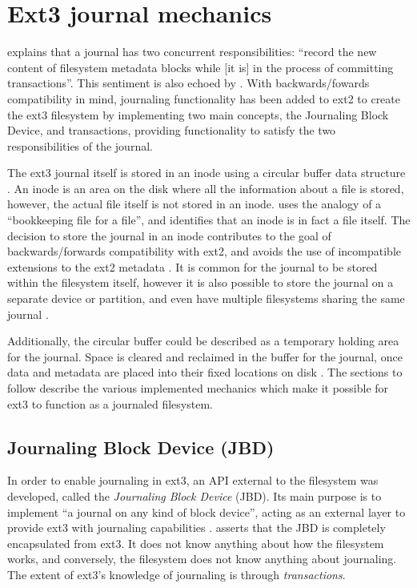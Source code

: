 \section{Ext3 journal mechanics}

\citet[p. 5]{Tweedie1998} explains that a journal has two concurrent responsibilities: ``record the new content of filesystem metadata blocks while [it is] in the process of committing transactions''. This sentiment is also echoed by \citet[p. 55]{Galli2001}. With backwards/fowards compatibility in mind, journaling functionality has been added to ext2 to create the ext3 filesystem by implementing two main concepts, the Journaling Block Device, and transactions, providing functionality to satisfy the two responsibilities of the journal.

The ext3 journal itself is stored in an inode using a circular buffer data structure \citep{Robbins2001a, Tweedie2000, Jones2008, Prabhakaran2005a}. An inode is an area on the disk where all the information about a file is stored, however, the actual file itself is not stored in an inode. \citet[p. 2]{Best2002} uses the analogy of a ``bookkeeping file for a file'', and identifies that an inode is in fact a file itself. The decision to store the journal in an inode contributes to the goal of backwards/forwards compatibility with ext2, and avoids the use of incompatible extensions to the ext2 metadata \citep{Robbins2001a}. It is common for the journal to be stored within the filesystem itself, however it is also possible to store the journal on a separate device or partition, and even have multiple filesystems sharing the same journal \citep{Prabhakaran2005a, Tweedie2000, Galli2001}.

Additionally, the circular buffer could be described as a temporary holding area for the journal. Space is cleared and reclaimed in the buffer for the journal, once data and metadata are placed into their fixed locations on disk \citep{Prabhakaran2005a}. The sections to follow describe the various implemented mechanics which make it possible for ext3 to function as a journaled filesystem.

\subsection{Journaling Block Device (JBD)}

In order to enable journaling in ext3, an API external to the filesystem was developed, called the \emph{Journaling Block Device} (JBD). Its main purpose is to implement ``a journal on any kind of block device'', acting as an external layer to provide ext3 with journaling capabilities \citep[p. 8]{Robbins2001a, Mauerer2008}. \citet{Tweedie2000} asserts that the JBD is completely encapsulated from ext3. It does not know anything about how the filesystem works, and conversely, the filesystem does not know anything about journaling. The extent of ext3's knowledge of journaling is through \emph{transactions}.

